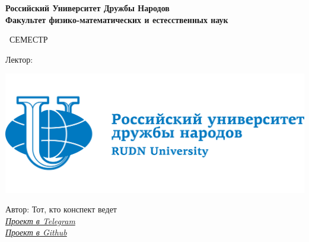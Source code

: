 \begin{titlepage}
	\clearpage\thispagestyle{empty}
	\centering
	
	\textbf{Российский Университет Дружбы Народов \\ Факультет физико-математических и естесственных наук}
	\vspace{33ex}
	
	{\Huge\textbf{\FullCourseNameFirstPart}}
	
	\SemesterNumber\ СЕМЕСТР  
	\vspace{1ex}
	
	Лектор: \textit{\LecturerInitials}
	
	\includegraphics[width=\textwidth]{images/logo.png}

	\begin{flushright}
		\noindent
		Автор: Тот, кто конспект ведет
		\\
		\href{\TGLink}{\textit{Проект в Telegram}}
		\\
		\href{\GitLink}{\textit{Проект в Github}}
	\end{flushright}
	
	\vfill
	\CourseDate
	\pagebreak
\end{titlepage}
